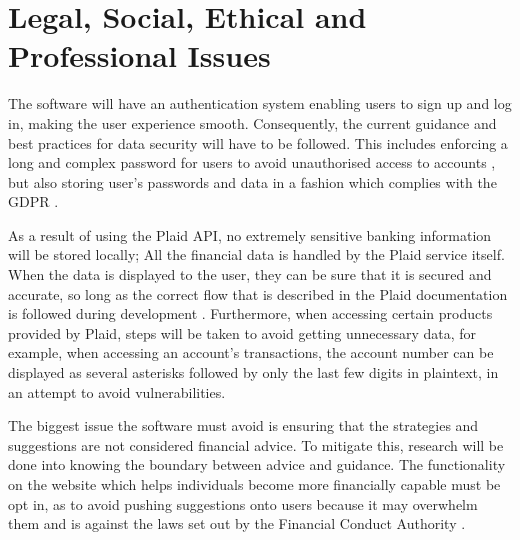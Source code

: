 \section{Legal, Social, Ethical and Professional Issues}
The software will have an authentication system enabling users to sign up and log in, making the user experience smooth. Consequently, the current guidance and best practices for data security will have to be followed. This includes enforcing a long and complex password for users to avoid unauthorised access to accounts \cite{PasswordRequirements}, but also storing user's passwords and data in a fashion which complies with the GDPR \cite{GDPR}.

As a result of using the Plaid API, no extremely sensitive banking information will be stored locally; All the financial data is handled by the Plaid service itself. When the data is displayed to the user, they can be sure that it is secured and accurate, so long as the correct flow that is described in the Plaid documentation is followed during development \cite{PlaidGettingStarted}. Furthermore, when accessing certain products provided by Plaid, steps will be taken to avoid getting unnecessary data, for example, when accessing an account's transactions, the account number can be displayed as several asterisks followed by only the last few digits in plaintext, in an attempt to avoid vulnerabilities.

The biggest issue the software must avoid is ensuring that the strategies and suggestions are not considered financial advice. To mitigate this, research will be done into knowing the boundary between advice and guidance. The functionality on the website which helps individuals become more financially capable must be opt in, as to avoid pushing suggestions onto users because it may overwhelm them and is against the laws set out by the Financial Conduct Authority \cite{AdviceVsGuidance}.